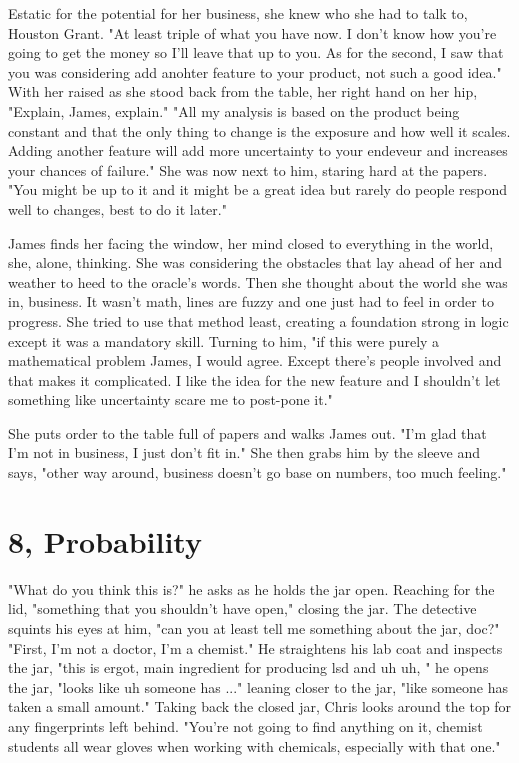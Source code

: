         Estatic for the potential for her business, she knew who she had to talk to, Houston Grant. "At least triple of what you have now. I
    don't know how you're going to get the money so I'll leave that up to you. As for the second, I saw that you was considering add anohter
    feature to your product, not such a good idea." With her raised as she stood back from the table, her right hand on her hip, "Explain, James,
    explain." "All my analysis is based on the product being constant and that the only thing to change is the exposure and how well it scales.
    Adding another feature will add more uncertainty to your endeveur and increases your chances of failure." She was now next to him, staring 
    hard at the papers. "You might be up to it and it might be a great idea but rarely do people respond well to changes, best to do it later."

        James finds her facing the window, her mind closed to everything in the world, she, alone, thinking. She was considering the obstacles
    that lay ahead of her and weather to heed to the oracle's words. Then she thought about the world she was in, business. It wasn't math, lines
    are fuzzy and one just had to feel in order to progress. She tried to use that method least, creating a foundation strong in logic except
    it was a mandatory skill. Turning to him, "if this were purely a mathematical problem James, I would agree. Except there's people involved
    and that makes it complicated. I like the idea for the new feature and I shouldn't let something like uncertainty scare me to post-pone it."

        She puts order to the table full of papers and walks James out. "I'm glad that I'm not in business, I just don't fit in." She then grabs
    him by the sleeve and says, "other way around, business doesn't go base on numbers, too much feeling."

\section{8, Probability}

        "What do you think this is?" he asks as he holds the jar open. Reaching for the lid, "something that you shouldn't have open," closing
    the jar. The detective squints his eyes at him, "can you at least tell me something about the jar, doc?" "First, I'm not a doctor, I'm a 
    chemist." He straightens his lab coat and inspects the jar, "this is ergot, main ingredient for producing lsd and uh uh, " he opens the jar,
    "looks like uh someone has ..." leaning closer to the jar, "like someone has taken a small amount." Taking back the closed jar, Chris looks
    around the top for any fingerprints left behind. "You're not going to find anything on it, chemist students all wear gloves when working
    with chemicals, especially with that one."

